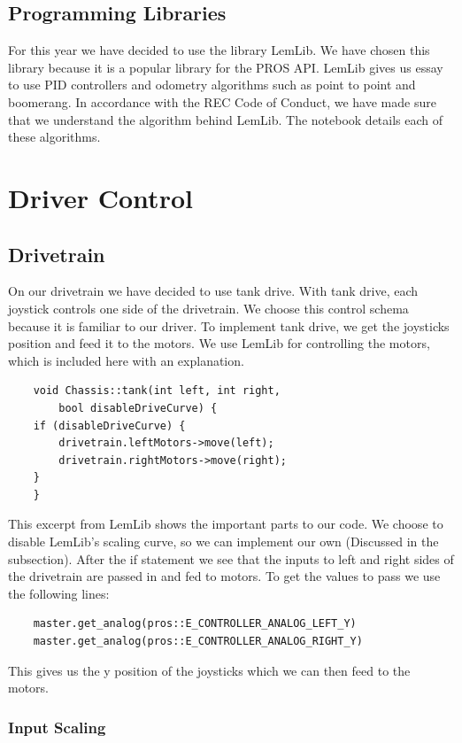 \documentclass[12pt]{report}
\begin{document}
\section{Programming Libraries}
For this year we have decided to use the library LemLib.
We have chosen this library because it is a popular library for the PROS API. 
LemLib gives us essay to use PID controllers and odometry algorithms such as point to point and boomerang.
In accordance with the REC Code of Conduct, 
    we have made sure that we understand the algorithm behind LemLib. 
The notebook details each of these algorithms.

\chapter{Driver Control}
\section{Drivetrain}
On our drivetrain we have decided to use tank drive.
With tank drive, each joystick controls one side of the drivetrain.
We choose this control schema because it is familiar to our driver.
To implement tank drive,
    we get the joysticks position and feed it to the motors.
We use LemLib for controlling the motors,
    which is included here with an explanation.
\begin{verbatim}
    void Chassis::tank(int left, int right, 
        bool disableDriveCurve) {
    if (disableDriveCurve) {
        drivetrain.leftMotors->move(left);
        drivetrain.rightMotors->move(right);
    }
    }
\end{verbatim}

This excerpt from LemLib shows the important parts to our code.
We choose to disable LemLib's scaling curve, so we can implement our own
    (Discussed in the subsection).
After the if statement we see that the inputs to left and right
    sides of the drivetrain are passed in and fed to motors.
To get the values to pass we use the following lines:
\begin{verbatim}
    master.get_analog(pros::E_CONTROLLER_ANALOG_LEFT_Y)
    master.get_analog(pros::E_CONTROLLER_ANALOG_RIGHT_Y)
\end{verbatim}
This gives us the y position of the joysticks which we can then
    feed to the motors.

\subsection{Input Scaling}
\end{document}
